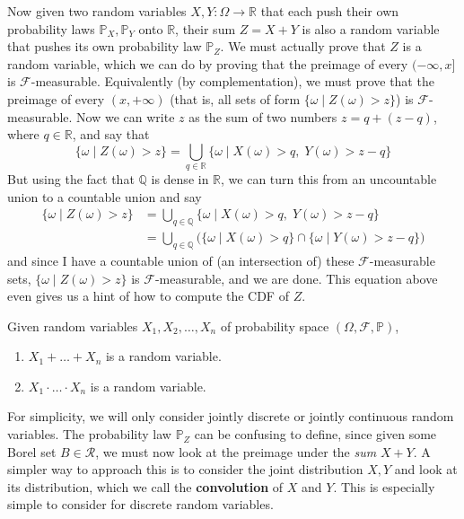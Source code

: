     Now given two random variables $X, Y: \Omega \rightarrow \mathbb{R}$ that each push their own probability laws $\mathbb{P}_X, \mathbb{P}_Y$ onto $\mathbb{R}$, their sum $Z = X + Y$ is also a random variable that pushes its own probability law $\mathbb{P}_Z$. We must actually prove that $Z$ is a random variable, which we can do by proving that the preimage of every $(-\infty, x]$ is $\mathcal{F}$-measurable. Equivalently (by complementation), we must prove that the preimage of every $(x, +\infty)$ (that is, all sets of form $\{ \omega \mid Z(\omega) > z\}$) is $\mathcal{F}$-measurable. Now we can write $z$ as the sum of two numbers $z = q + (z - q)$, where $q \in \mathbb{R}$, and say that 
    \begin{equation}
      \{ \omega \mid Z(\omega) > z\} = \bigcup_{q \in \mathbb{R}} \{ \omega \mid X (\omega) > q , \; Y(\omega) > z - q\}
    \end{equation}
    But using the fact that $\mathbb{Q}$ is dense in $\mathbb{R}$, we can turn this from an uncountable union to a countable union and say 
    \begin{align}
      \{ \omega \mid Z(\omega) > z\} & = \bigcup_{q \in \mathbb{Q}} \{ \omega \mid X (\omega) > q , \; Y(\omega) > z - q\} \\
      & = \bigcup_{q \in \mathbb{Q}} \big( \{\omega \mid X(\omega) > q\} \cap \{ \omega \mid Y(\omega) > z - q\} \big) 
    \end{align}
    and since I have a countable union of (an intersection of) these $\mathcal{F}$-measurable sets, $\{ \omega \mid Z(\omega) > z\}$ is $\mathcal{F}$-measurable, and we are done. This equation above even gives us a hint of how to compute the CDF of $Z$. 

    \begin{theorem}
      Given random variables $X_1, X_2, \ldots, X_n$ of probability space $(\Omega, \mathcal{F}, \mathbb{P})$, 
      \begin{enumerate}
        \item $X_1 + \ldots + X_n$ is a random variable.
        \item $X_1 \cdot \ldots \cdot X_n$ is a random variable. 
      \end{enumerate}
    \end{theorem}

    For simplicity, we will only consider jointly discrete or jointly continuous random variables. The probability law $\mathbb{P}_Z$ can be confusing to define, since given some Borel set $B \in \mathcal{R}$, we must now look at the preimage under the \textit{sum} $X + Y$. A simpler way to approach this is to consider the joint distribution $X, Y$ and look at its distribution, which we call the \textbf{convolution} of $X$ and $Y$. This is especially simple to consider for discrete random variables. 

